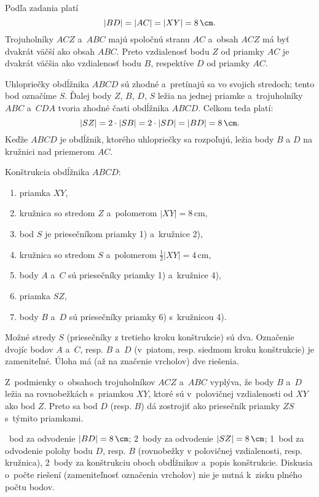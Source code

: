 {%
Podľa zadania platí
$$
|BD|=|AC|=|XY|=8\,\cm.
$$
Trojuholníky $ACZ$ a~$ABC$ majú spoločnú stranu $AC$ a~obsah $ACZ$ má byť dvakrát väčší ako obsah $ABC$.
Preto vzdialenosť bodu $Z$ od priamky $AC$ je dvakrát väčšia ako vzdialenosť bodu $B$, respektíve $D$  od priamky $AC$.

Uhlopriečky obdĺžnika $ABCD$ sú zhodné a~pretínajú sa vo svojich stredoch; tento bod označíme $S$.
Ďalej body $Z$, $B$, $D$, $S$ ležia na jednej priamke a~trojuholníky $ABC$ a~$CDA$ tvoria zhodné časti obdĺžnika $ABCD$.
Celkom teda platí:
$$
|SZ|=2\cdot|SB|=2\cdot|SD|=|BD|=8\,\cm.
$$
Keďže $ABCD$ je obdĺžnik, ktorého uhlopriečky sa rozpoľujú, ležia body $B$ a $D$ na kružnici nad priemerom $AC$.
%

Konštrukcia obdĺžnika $ABCD$:
\begin{enumerate}
 \item priamka $XY$,
 \item kružnica so stredom $Z$ a~polomerom $|XY|=8$\,cm,
 \item bod $S$ je priesečníkom priamky 1) a~kružnice 2),
 \item kružnica so stredom $S$ a~polomerom $\frac12|XY|=4$\,cm,
 \item body $A$ a~$C$ sú priesečníky priamky 1) a~kružnice 4),
 \item priamka $SZ$,
 \item body $B$ a~$D$ sú priesečníky priamky 6) s~kružnicou 4).
\end{enumerate}

Možné stredy $S$ (priesečníky z tretieho kroku konštrukcie) sú dva.
Označenie dvojíc bodov $A$ a~$C$, resp. $B$ a~$D$ (v~piatom, resp. siedmom kroku konštrukcie) je zameniteľné.
Úloha má (až na značenie vrcholov) dve riešenia.

\poznamky
Z~podmienky o~obsahoch trojuholníkov $ACZ$ a~$ABC$ vyplýva, že body $B$ a~$D$ ležia na rovnobežkách s~priamkou $XY$, ktoré sú v~polovičnej vzdialenosti od $XY$ ako bod $Z$.
Preto sa bod $D$ (resp. $B$) dá zostrojiť ako priesečník priamky $ZS$ s~týmito priamkami.

~bod za odvodenie $|BD|=8\,\cm$;
2~body za odvodenie $|SZ|=8\,\cm$;
1~bod za odvodenie polohy bodu $D$, resp. $B$ (rovnobežky v polovičnej vzdialenosti, resp. kružnica),
2~body za konštrukciu oboch obdĺžnikov a~popis konštrukcie.
Diskusia o~počte riešení (zameniteľnosť označenia vrcholov) nie je nutná k~zisku plného počtu bodov.
\endhodnotenie
}


